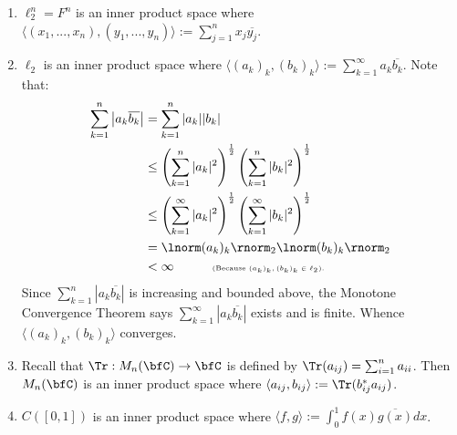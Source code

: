         \begin{center}
        \end{center}

    \begin{example}
        \phantom{a}
        \begin{enumerate}[label = (\arabic*),itemsep=1pt,topsep=3pt]
            \item $\ell_2^n = F^n$ is an inner product space where $\langle (x_1,...,x_n),(y_1,...,y_n) \rangle := \sum_{j = 1}^n x_j \overline{y_j}$.
            \item $\ell_2$ is an inner product space where $\langle (a_k)_k,(b_k)_k \rangle := \sum_{k = 1}^\infty a_k \overline{b_k}$. Note that:
                \begin{equation*}
                \begin{split}
                    \sum_{k = 1}^n \left|a_k \overline{b_k}\right| 
                    & = \sum_{k = 1}^n |a_k||b_k| \\
                    & \leq \left( \sum_{k = 1}^n |a_k|^2 \right)^\frac{1}{2} \left( \sum_{k = 1}^n |b_k|^2 \right)^\frac{1}{2} \\
                    & \leq \left( \sum_{k = 1}^\infty |a_k|^2 \right)^\frac{1}{2} \left( \sum_{k = 1}^\infty |b_k|^2 \right)^\frac{1}{2} \\
                    & = \lnorm (a_k)_k \rnorm_2 \lnorm (b_k)_k \rnorm_2 \\
                    & < \infty \quad\quad\quad \text{\tiny (Because $(a_k)_k,(b_k)_k \in \ell_2)$.}
                \end{split}
                \end{equation*}
            Since $\sum_{k = 1}^n |a_k \overline{b_k}|$ is increasing and bounded above, the Monotone Convergence Theorem says $\sum_{k = 1}^\infty|a_k \overline{b_k}|$ exists and is finite. Whence $\langle (a_k)_k,(b_k)_k \rangle$ converges.

            \item Recall that $\Tr:M_n(\bfC) \rightarrow \bfC$ is defined by $\Tr(a_{ij}) = \sum_{i  =1}^n a_{ii}$.
            Then $M_n(\bfC)$ is an inner product space where $\langle a_{ij},b_{ij} \rangle := \Tr(b_{ij}^\ast a_{ij})$.

            \item $C([0,1])$ is an inner product space where $\langle f,g \rangle := \int_0^1 f(x) \overline{g(x)}dx$.
        \end{enumerate}
    \end{example}

